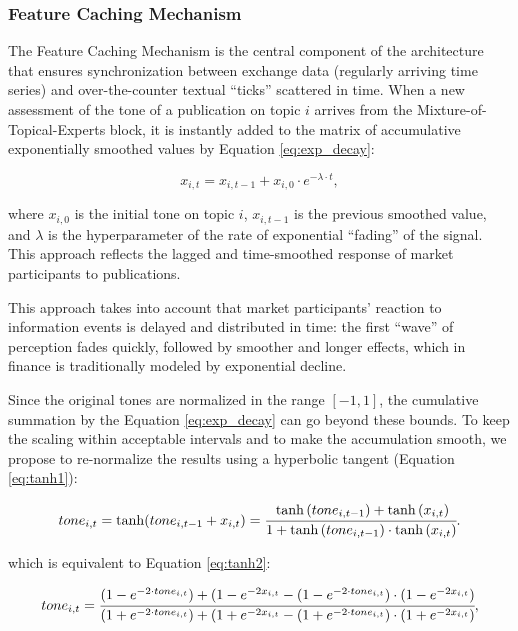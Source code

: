 \subsubsection{Feature Caching Mechanism}
The Feature Caching Mechanism is the central component of the architecture that ensures synchronization
between exchange data (regularly arriving time series) and over-the-counter textual “ticks” scattered
in time. When a new assessment of the tone of a publication on topic $i$ arrives from the Mixture-of-Topical-Experts
block, it is instantly added to the matrix of accumulative exponentially smoothed values by Equation \ref{eq:exp_decay}:

\begin{equation}\label{eq:exp_decay}
    x_{i,t}=x_{i, t-1} + x_{i, 0} \cdot e^{-\lambda \cdot t},
\end{equation}

where $x_{i, 0}$ is the initial tone on topic $i$, $x_{i,t-1}$ is the previous smoothed value, and $\lambda$
is the hyperparameter of the rate of exponential “fading” of the signal. This approach reflects the lagged
and time-smoothed response of market participants to publications.

This approach takes into account that market participants' reaction to information events is delayed
and distributed in time: the first “wave” of perception fades quickly, followed by smoother and longer
effects, which in finance is traditionally modeled by exponential decline.

Since the original tones are normalized in the range $[-1,1]$, the cumulative summation by the
Equation \ref{eq:exp_decay} can go beyond these bounds. To keep the scaling within acceptable
intervals and to make the accumulation smooth, we propose to re-normalize the results using
a hyperbolic tangent (Equation \ref{eq:tanh1}):

\begin{equation}\label{eq:tanh1}
    tone_{i, t} = \tanh(tone_{i, t-1} + x_{i,t}) =
    \cfrac{
        \tanh{(tone_{i, t-1})} + \tanh{(x_{i,t})}
    }{
        1 + \tanh{(tone_{i, t-1})} \cdot \tanh{(x_{i,t})}
    }.
\end{equation}

which is equivalent to Equation \ref{eq:tanh2}:

\begin{equation}\label{eq:tanh2}
    tone_{i, t} =
    \cfrac{
        (1-e^{-2 \cdot tone_{i, t}})+(1-e^{-2x_{i,t}} - (1-e^{-2 \cdot tone_{i, t}}) \cdot(1-e^{-2x_{i,t}})
    }{
        (1+e^{-2 \cdot tone_{i, t}})+(1+e^{-2x_{i,t}} - (1+e^{-2 \cdot tone_{i, t}}) \cdot(1+e^{-2x_{i,t}})
    },
\end{equation}

